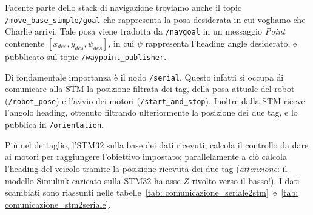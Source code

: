 \vspace{0.5mm}
Facente parte dello stack di navigazione troviamo anche il topic \verb|/move_base_simple/goal| che rappresenta la posa desiderata in cui vogliamo che Charlie arrivi. 
Tale posa viene tradotta da \verb|/navgoal| in un messaggio \textit{Point} contenente $[x_{des}, y_{des}, \psi_{des}]$, in cui $\psi$ rappresenta l'heading angle desiderato, e pubblicato sul topic \verb|/waypoint_publisher|.

\vspace{0.5mm}
Di fondamentale importanza \`e il nodo \verb|/serial|. Questo infatti si occupa di comunicare alla STM la posizione filtrata dei tag, della posa attuale del robot (\verb|/robot_pose|) e l'avvio dei motori (\verb|/start_and_stop|). 
Inoltre dalla STM riceve l'angolo heading, ottenuto filtrando ulteriormente la posizione dei due tag, e lo pubblica in \verb|/orientation|.

Pi\`u nel dettaglio, l'STM32 sulla base dei dati ricevuti, calcola il controllo da dare ai motori per raggiungere l’obiettivo impostato; parallelamente a ciò calcola l'heading del veicolo tramite la posizione ricevuta dei due tag (\textit{attenzione}: il modello Simulink caricato sulla STM32 ha asse $Z$ rivolto verso il basso!).
I dati scambiati sono riassunti nelle tabelle~\ref{tab: comunicazione_seriale2stm}~e~\ref{tab: comunicazione_stm2seriale}.

